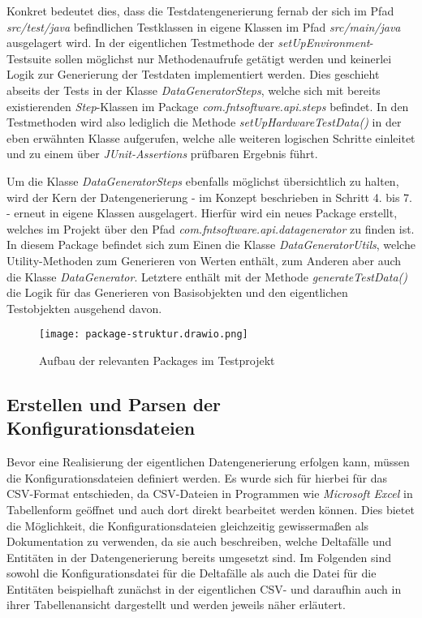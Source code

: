 Konkret bedeutet dies, dass die Testdatengenerierung fernab der sich im Pfad \textit{src/test/java} befindlichen Testklassen in eigene Klassen im Pfad \textit{src/main/java} ausgelagert wird. In der eigentlichen Testmethode der \textit{setUpEnvironment}-Testsuite sollen möglichst nur Methodenaufrufe getätigt werden und keinerlei Logik zur Generierung der Testdaten implementiert werden. Dies geschieht abseits der Tests in der Klasse \textit{DataGeneratorSteps}, welche sich mit bereits existierenden \textit{Step}-Klassen im Package \textit{com.fntsoftware.api.steps} befindet. In den Testmethoden wird also lediglich die Methode \textit{setUpHardwareTestData()} in der eben erwähnten Klasse aufgerufen, welche alle weiteren logischen Schritte einleitet und zu einem über \textit{JUnit-Assertions} prüfbaren Ergebnis führt.

Um die Klasse \textit{DataGeneratorSteps} ebenfalls möglichst übersichtlich zu halten, wird der Kern der Datengenerierung - im Konzept beschrieben in Schritt 4. bis 7. - erneut in eigene Klassen ausgelagert. Hierfür wird ein neues Package erstellt, welches im Projekt über den Pfad \textit{com.fntsoftware.api.datagenerator} zu finden ist. In diesem Package befindet sich zum Einen die Klasse \textit{DataGeneratorUtils}, welche Utility-Methoden zum Generieren von Werten enthält, zum Anderen aber auch die Klasse \textit{DataGenerator}. Letztere enthält mit der Methode \textit{generateTestData()} die Logik für das Generieren von Basisobjekten und den eigentlichen Testobjekten ausgehend davon.

\begin{figure}[h]
    \centering
    \texttt{[image: package-struktur.drawio.png]}
    \caption{Aufbau der relevanten Packages im Testprojekt}
\end{figure}

\subsection{Erstellen und Parsen der Konfigurationsdateien}\label{subsec:config}
Bevor eine Realisierung der eigentlichen Datengenerierung erfolgen kann, müssen die Konfigurationsdateien definiert werden. Es wurde sich für hierbei für das \ac{CSV}-Format entschieden, da \ac{CSV}-Dateien in Programmen wie \textit{Microsoft Excel} in Tabellenform geöffnet und auch dort direkt bearbeitet werden können. \cite{excel:2022} Dies bietet die Möglichkeit, die Konfigurationsdateien gleichzeitig gewissermaßen als Dokumentation zu verwenden, da sie auch beschreiben, welche Deltafälle und Entitäten in der Datengenerierung bereits umgesetzt sind. Im Folgenden sind sowohl die Konfigurationsdatei für die Deltafälle als auch die Datei für die Entitäten beispielhaft zunächst in der eigentlichen \ac{CSV}- und daraufhin auch in ihrer Tabellenansicht dargestellt und werden jeweils näher erläutert.

